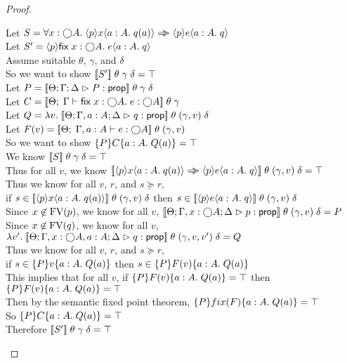 \begin{proof}
  \begin{tabbedproof}
    \oo Let $S = \forall x:\monad{A}.\; \mspec{p}x{a:A}{q(a)} \specimp \mspec{p}{e}{a:A}{q}$\\
    \oo Let $S' = \mspec{p}{\fix{x:\monad{A}}{e}}{a:A}{q}$ \\
    \oo Assume suitable $\theta$, $\gamma$, and $\delta$ \\
    \ooo So we want to show $\interp{S'}\;\theta\;\gamma\;\delta = \top$ \\
    \ooo Let $P = \interp{\judgeA{P}{\assert}}\;\theta\;\gamma\;\delta$ \\
    \ooo Let $C = \interp{\judgeE{\Gamma}{\fix{x:\monad{A}}{e}}{\monad{A}}}\;\theta\;\gamma$ \\
    \ooo Let $Q = \semfun{v}{\interp{\judgeA[\Theta; \Gamma, a:A; \Delta]{q}{\assert}}\;\theta\;(\gamma, v)\;\delta}$ \\
    \ooo Let $F(v) = \interp{\judgeE{\Gamma, a:A}{e}{\monad{A}}}\;\theta\;(\gamma, v)$ \\
    \ooo So we want to show $\spec{P}{C}{a:A}{Q(a)} = \top$ \\
    \ooo We know $\interp{S}\;\theta\;\gamma\;\delta = \top$ \\
    \ooo Thus for all $v$, we know $\interp{\mspec{p}x{a:A}{q(a)} \specimp \mspec{p}{e}{a:A}{q}}\;\theta\;(\gamma, v)\;\delta = \top$ \\
    \ooo Thus we know for all $v$, $r$, and $s \succeq r$, \\
    \ooox if $s \in \interp{\mspec{p}x{a:A}{q(a)}}\;\theta\;(\gamma, v)\;\delta$ then $s \in \interp{\mspec{p}{e}{a:A}{q}}\;\theta\;(\gamma, v)\;\delta$ \\
    \ooo Since $x \not\in \FV{p}$, we know for all $v$, 
         $\interp{\judgeA[\Theta; \Gamma,x:\monad{A}; \Delta]{p}{\assert}}\;\theta\;(\gamma, v)\;\delta = P$ \\
    \ooo Since $x \not\in \FV{q}$, we know for all $v$, 
         $\semfun{v'}{\interp{\judgeA[\Theta; \Gamma, x:\monad{A}, a:A; \Delta]{q}{\assert}}\;\theta\;(\gamma,v,v') \;\delta} = Q$ \\
    \ooo Thus we know for all $v$, $r$, and $s \succeq r$, \\
    \ooox if $s \in  \spec{P}{v}{a:A}{Q(a)}$ then 
             $s \in \spec{P}{F(v)}{a:A}{Q(a)}$ \\
    \ooo This implies that for all $v$, if $\spec{P}{F(v)}{a:A}{Q(a)} = \top $ 
                                        then $\spec{P}{F(v)}{a:A}{Q(a)} = \top$ \\
    \ooo Then by the semantic fixed point theorem, 
          $\spec{P}{fix(F)}{a:A}{Q(a)} = \top$ \\
    \ooo So $\spec{P}{C}{a:A}{Q(a)} = \top$ \\
    \ooo Therefore $\interp{S'}\;\theta\;\gamma\;\delta = \top$ \\
  \end{tabbedproof}
\end{proof}

